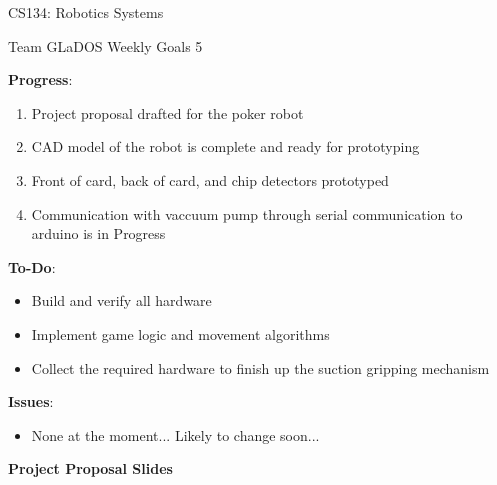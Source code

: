\documentclass[12 pt]{article}
\newcommand{\setnum}{5}
\begin{document}
\begin{center}
    \Large \color{blue} CS134: Robotics Systems\color{black}
    \begin{center}\normalsize Team GLaDOS Weekly Goals \setnum{}\end{center}
    \noindent{\color{black} \rule{\linewidth}{0.5mm} }
\end{center}

\textbf{Progress}:
    \begin{enumerate}
        \item Project proposal drafted for the poker robot 
        \item CAD model of the robot is complete and ready for prototyping
        \item Front of card, back of card, and chip detectors prototyped
        \item Communication with vaccuum pump through serial communication to arduino is in Progress
    \end{enumerate}

\textbf{To-Do}:
    \begin{itemize}
        \item Build and verify all hardware
        \item Implement game logic and movement algorithms 
        \item Collect the required hardware to finish up the suction gripping mechanism
    \end{itemize}

\textbf{Issues}:
    \begin{itemize}
        \item None at the moment... Likely to change soon...
    \end{itemize}

\textbf{Project Proposal Slides}

\end{document}
